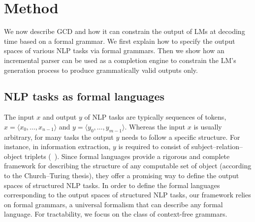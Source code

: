 \section{Method}\label{sec:method}
We now describe GCD and how it can constrain the output of LMs at decoding time based on a formal grammar.
%
We first explain how to specify the output spaces of various NLP tasks via formal grammars.
Then we show how an incremental parser can be used as a completion engine to constrain the LM's generation process to produce grammatically valid outputs only.

\subsection{NLP tasks as formal languages}\label{subsec:define-the-output-of-nlp-tasks-as-formal-languages}

The input $x$ and output $y$ of NLP tasks are typically sequences of tokens, $x = \langle x_0, \dots, x_{n-1} \rangle$ and $y = \langle y_0, \dots, y_{m-1} \rangle$.
Whereas the input $x$ is usually arbitrary, for many tasks the output $y$ needs to follow a specific structure.
For instance, in information extraction, $y$ is required to consist of subject--relation--object triplets (\cf\ ).
Since formal languages provide a rigorous and complete framework for describing the structure of any computable set of object (according to the Church--Turing thesis), they offer a promising way to define the output spaces of structured NLP tasks.
In order to define the formal languages corresponding to the output spaces of structured NLP tasks, our framework relies on formal grammars, a universal formalism that can describe any formal language.
For tractability, we focus on the class of context-free grammars.




